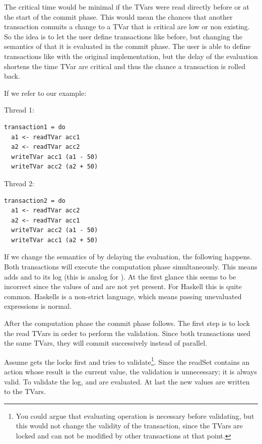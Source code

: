 The critical time would be minimal if the TVars were read directly before or at the start of the commit phase.
This would mean the chances that another transaction commits a change to a TVar that is critical are low or non
existing. So the idea is to let the user define transactions like before, but changing the semantics of 
 that it is evaluated in the commit phase. The user is able to define transactions like with 
the original implementation, but the delay of the evaluation shortens the time TVar are critical and thus
the chance a transaction is rolled back. 

If we refer to our example: 
\par\noindent
\begin{minipage}[t]{.45\textwidth}
Thread 1:
\begin{lstlisting}[frame=lrtb]
transaction1 = do
  a1 <- readTVar acc1
  a2 <- readTVar acc2
  writeTVar acc1 (a1 - 50)
  writeTVar acc2 (a2 + 50)
\end{lstlisting}
\end{minipage}
\hfill
\begin{minipage}[t]{.45\textwidth}
Thread 2:
\begin{lstlisting}[frame=lrtb]
transaction2 = do 
  a1 <- readTVar acc2
  a2 <- readTVar acc1
  writeTVar acc2 (a1 - 50)
  writeTVar acc1 (a2 + 50)
\end{lstlisting}
\end{minipage}

If we change the semantics of  by delaying the evaluation, the following happens.
Both transactions will execute the computation phase simultaneously. This means  adds
 and  to its log (this is analog for ).
At the first glance this seems to be incorrect since the values of  and  are not yet present.
For Haskell this is quite common. Haskells is a non-strict language, which means passing unevaluated expressions
is normal. 

After the computation phase the commit phase follows. The first step is to lock the read TVars in order to 
perform the validation. Since both transactions used the same TVars, they will commit successively instead of
parallel. 

Assume  gets the locks first and tries to validate\footnote{You could argue that 
evaluating  operation is necessary before validating, but this would not change the validity of the 
transaction, since the TVars are locked and can not be modified by other transactions at that point.}. 
Since the readSet contains an action whose result is the current value, the validation is unnecessary; it is always valid.
To validate the log,  and  are evaluated. At last the new values are written to the TVars.

